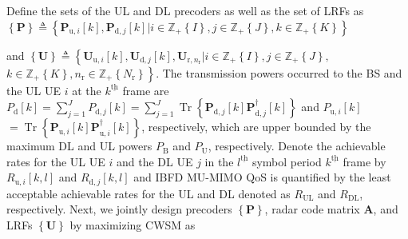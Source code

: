 \documentclass[10pt,journal]{IEEEtran}
\DeclareMathOperator{\trace}{Tr}
\newcommand{\bracket}[1]{{\left [{#1}\right ]}}
\newcommand{\braces}[1]{{\left\{ {#1}\right\}}}
\newcommand{\ith}[1]    {{#1}^{\underline{\text{th}}}}
\newcommand{\rr}{_\mathrm{r}}
\newcommand{\B}{\textrm{B}}
\newcommand{\rnr}{_{\mathrm{r},n_\mathrm{r}}}
\newcommand{\PiB}{\mathbf{P}_{\textrm{u},i}\bracket{k}}
\newcommand{\PiBH}{\mathbf{P}^\dagger_{\textrm{u},i}\bracket{k}}
\newcommand{\PBj}{\mathbf{P}_{\textrm{d},j}\bracket{k}}
\newcommand{\PBjH}{\mathbf{P}^\dagger_{\textrm{d},j}\bracket{k}}
\newcommand{\UiB}{\mathbf{U}_{\textrm{u},i}\bracket{k}}
\newcommand{\UBj}{\mathbf{U}_{\textrm{d},j}\bracket{k}}
\theoremstyle{definition}
\begin{document}
	Define the sets of the UL and DL precoders as well as the set of LRFs as $\braces{\mathbf{P}}\triangleq\braces{\PiB,\PBj | i\in\mathbb{Z}_+\braces{I}, j\in\mathbb{Z}_+\braces{J}, k\in\mathbb{Z}_+\braces{K}}$

	and
	$\braces{\mathbf{U}}\triangleq\left\lbrace\UiB, \UBj, \mathbf{U}\rnr | i\in\mathbb{Z}_+\braces{I}, j\in\mathbb{Z}_+\braces{J},\right.$ $\left.k\in\mathbb{Z}_+\braces{K}, n\rr\in \mathbb{Z}_+\braces{N\rr}\right\rbrace$. 
	The transmission powers occurred to the BS and the UL UE $i$ at the $\ith{k}$ frame are $P_{\mathrm{d}}\bracket{k}=\sum_{j=1}^{J}\mathit{P}_{\mathrm{d},j}\bracket{k}=\sum_{j=1}^{J}\trace\braces{\PBj\PBjH}$ and $\mathit{P}_{\mathrm{u},i}\bracket{k}$ $=\trace\braces{\PiB\PiBH}$, respectively, which are upper bounded by the maximum DL and UL powers $\mathit{P}_\B$ and $\mathit{P}_{\mathrm{U}}$, respectively. Denote the achievable rates for the UL UE $i$ and the DL UE $j$ in the $\ith{l}$ symbol period $\ith{k}$ frame by $R_{\mathrm{u},i}\bracket{k,l}$ and $R_{\mathrm{d},j}\bracket{k,l}$ and IBFD MU-MIMO QoS is quantified by the least acceptable achievable rates for the UL and DL denoted as $\mathit{R}_{\mathrm{UL}}$ and $\mathit{R}_{\mathrm{DL}}$, respectively. Next, we jointly design precoders $\braces{\mathbf{P}}$, radar code matrix $\mathbf{A}$, and LRFs $\braces{\mathbf{U}}$ by maximizing CWSM as \par\noindent\small
\end{document}
